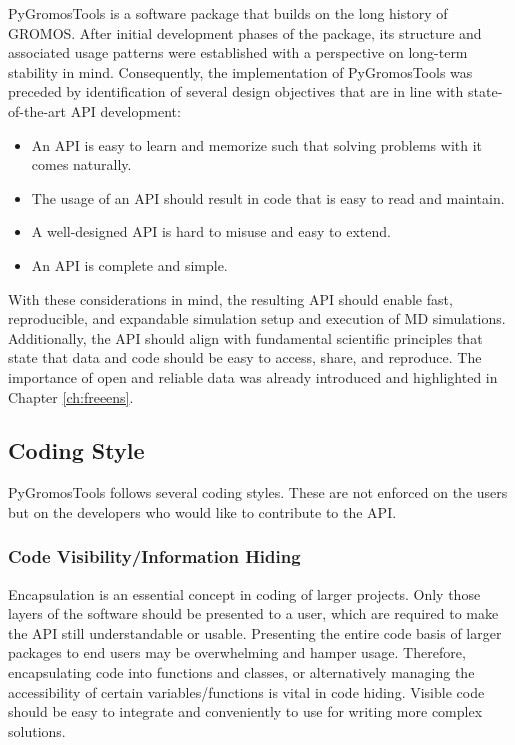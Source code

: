 PyGromosTools is a software package that builds on the long history of GROMOS. After initial development phases of the package, its structure and associated usage patterns were established with a perspective on long-term stability in mind. Consequently, the implementation of PyGromosTools was preceded by identification of several design objectives that are in line with state-of-the-art API development: \cite{Henning2009, Blanchette2008, Bloch2006}
%
\begin{itemize}
    \item An API is easy to learn and memorize such that solving problems with it comes naturally. 
    \item The usage of an API should result in code that is easy to read and maintain.
    \item A well-designed API is hard to misuse and easy to extend.
    \item An API is complete and simple. 
\end{itemize}
%
With these considerations in mind, the resulting API should enable fast, reproducible, and expandable simulation setup and execution of MD simulations. Additionally, the API should align with fundamental scientific principles that state that data and code should be easy to access, share, and reproduce. The importance of open and reliable data was already introduced and highlighted in Chapter \ref{ch:freeens}.

\subsection{Coding Style}
PyGromosTools follows several coding styles. These are not enforced on the users but on the developers who would like to contribute to the API. 

\subsubsection{Code Visibility/Information Hiding}
Encapsulation is an essential concept in coding of larger projects. Only those layers of the software should be presented to a user, which are required to make the API still understandable or usable. Presenting the entire code basis of larger packages to end users may be overwhelming and hamper usage. Therefore, encapsulating code into functions and classes, or alternatively managing the accessibility of certain variables/functions is vital in code hiding.\cite{Leino2002, Ganney2020} Visible code should be easy to integrate and conveniently to use for writing more complex solutions.

